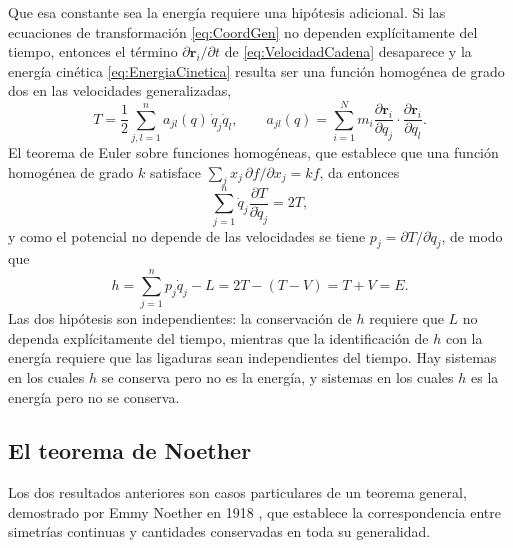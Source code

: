         Que esa constante sea la energía requiere una hipótesis adicional. Si las ecuaciones de transformación \eqref{eq:CoordGen} no dependen explícitamente del tiempo, entonces el término $\partial\mathbf{r}_{i}/\partial t$ de \eqref{eq:VelocidadCadena} desaparece y la energía cinética \eqref{eq:EnergiaCinetica} resulta ser una función homogénea de grado dos en las velocidades generalizadas,
        \begin{equation}\label{eq:THomogenea}
            T = \frac{1}{2}\sum_{j,l=1}^{n} a_{jl}(q)\,\dot{q}_{j}\dot{q}_{l},
            \qquad
            a_{jl}(q) = \sum_{i=1}^{N} m_{i}\frac{\partial\mathbf{r}_{i}}{\partial q_{j}}\cdot\frac{\partial\mathbf{r}_{i}}{\partial q_{l}} .
        \end{equation}
        El teorema de Euler sobre funciones homogéneas, que establece que una función homogénea de grado $k$ satisface $\sum_{j}x_{j}\,\partial f/\partial x_{j} = kf$, da entonces
        \begin{equation}\label{eq:EulerHomogenea}
            \sum_{j=1}^{n}\dot{q}_{j}\frac{\partial T}{\partial\dot{q}_{j}} = 2T,
        \end{equation}
        y como el potencial no depende de las velocidades se tiene $p_{j} = \partial T/\partial\dot{q}_{j}$, de modo que
        \begin{equation}\label{eq:hEsEnergia}
            h = \sum_{j=1}^{n}p_{j}\dot{q}_{j} - L = 2T - (T - V) = T + V = E .
        \end{equation}
        Las dos hipótesis son independientes: la conservación de $h$ requiere que $L$ no dependa explícitamente del tiempo, mientras que la identificación de $h$ con la energía requiere que las ligaduras sean independientes del tiempo. Hay sistemas en los cuales $h$ se conserva pero no es la energía, y sistemas en los cuales $h$ es la energía pero no se conserva.

    \subsection{El teorema de Noether}

        Los dos resultados anteriores son casos particulares de un teorema general, demostrado por Emmy Noether en 1918 \citep{noether1918invariante}, que establece la correspondencia entre simetrías continuas y cantidades conservadas en toda su generalidad.

